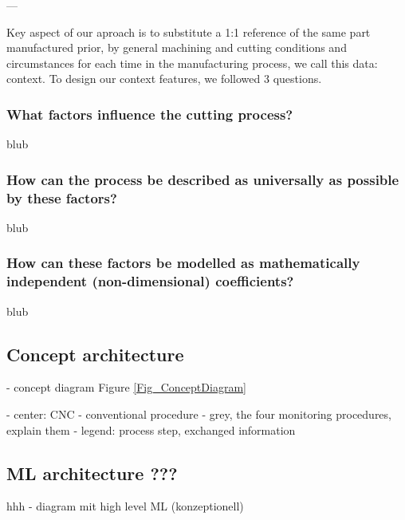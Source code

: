 \documentclass[5p,times,procedia]{elsarticle}
\begin{document}
---

Key aspect of our aproach is to substitute a 1:1 reference of the same part manufactured prior, by general machining and cutting conditions and circumstances for each time in the manufacturing process, we call this data: context.
To design our context features, we followed 3 questions.

\vspace*{-.5\baselineskip}
\subsubsection{What factors influence the cutting process?}
blub

\vspace*{-.5\baselineskip}
\subsubsection{How can the process be described as universally as possible by these factors?}
blub

\vspace*{-.5\baselineskip}
\subsubsection{How can these factors be modelled as mathematically independent (non-dimensional) coefficients?} 
blub





\subsection{Concept architecture}
\vspace*{-\baselineskip}
- concept diagram Figure \ref{Fig_ConceptDiagram}

- center: CNC
- conventional procedure
- grey, the four monitoring procedures, explain them
- legend: process step, exchanged information


\subsection{ML architecture ???}
\vspace*{-\baselineskip}
hhh
- diagram mit high level ML (konzeptionell)
\end{document}
